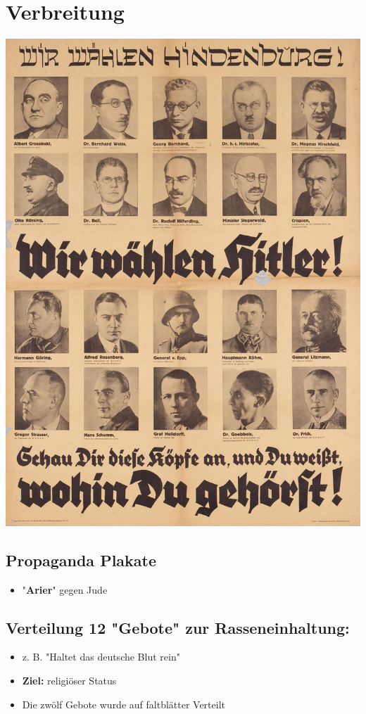 \documentclass{article}
\begin{document}
\section{Verbreitung}
\label{sec:org4b6d6f5}
\begin{center}
\includegraphics[width=.9\linewidth]{./rassenlehre.jpg}
\end{center}

\subsection{Propaganda Plakate}
\label{sec:orgb95805a}
\begin{itemize}
\item "\textbf{Arier}" gegen Jude
\end{itemize}
\subsection{Verteilung 12 "Gebote" zur Rasseneinhaltung:}
\label{sec:orga564d24}
\begin{itemize}
\item z. B. "Haltet das deutsche Blut rein"
\item \textbf{Ziel:} religiöser Status
\item Die zwölf Gebote wurde auf faltblätter Verteilt
\end{itemize}
\end{document}
